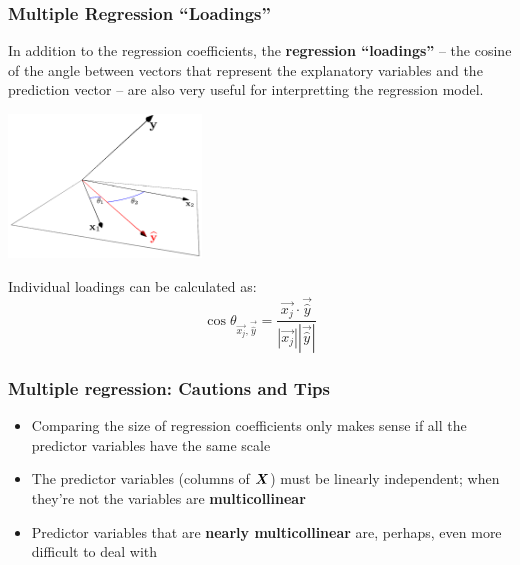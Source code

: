 \documentclass{beamer}
\begin{document}
\begin{frame}
  \frametitle{Multiple Regression ``Loadings''}


In addition to the regression coefficients, the \textbf{regression ``loadings''} -- the cosine of the angle between vectors that represent the explanatory variables and the prediction vector -- are also very useful for interpretting the regression model.

\begin{center}
\includegraphics[height=1.5in]{fig-multiregr-loadings.pdf}
\end{center}

Individual loadings can be calculated as:
		\[
		\cos \theta_{\vec{x_j},\vec{\widehat{y}}} = \frac{\vec{x_j} \cdot \vec{\widehat{y}}}{|\vec{x_j}||\vec{\widehat{y}}|}
		\]


\end{frame}




\begin{frame}
  \frametitle{Multiple regression: Cautions and Tips}


\begin{itemize}
    \item Comparing the size of regression coefficients only makes sense if all the predictor variables have the same scale
	\item The predictor variables  (columns of $\bm{X}$) must be linearly independent; when they're not the variables are \textbf{multicollinear}
	\item Predictor variables that are \textbf{nearly multicollinear} are, perhaps, even more difficult to deal with
\end{itemize}

\end{frame}

\end{document}
